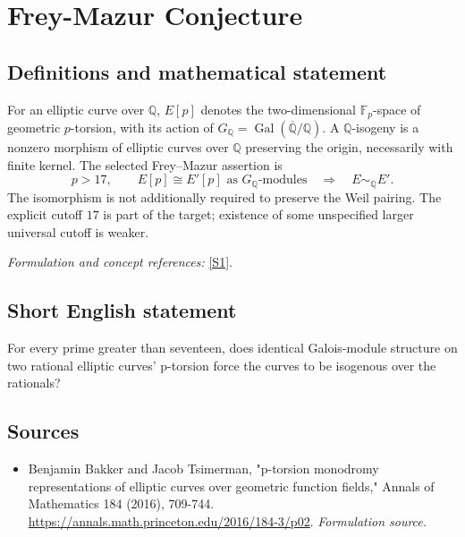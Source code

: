 \documentclass[11pt]{article}
\begin{document}
\section*{\texorpdfstring{Frey-Mazur Conjecture}{Frey-Mazur Conjecture}}\label{30006835}
\subsection{Definitions and mathematical statement}
For an elliptic curve over ${\mathbb{Q}}$, $E[p]$ denotes the two-dimensional ${\mathbb{F}}_p$-space of geometric $p$-torsion, with its action of $G_{{\mathbb{Q}}}=\operatorname{Gal}(\overline{{\mathbb{Q}}}/{\mathbb{Q}})$. A ${\mathbb{Q}}$-isogeny is a nonzero morphism of elliptic curves over ${\mathbb{Q}}$ preserving the origin, necessarily with finite kernel. The selected Frey--Mazur assertion is
\[
 p>17,\qquad E[p]\cong E'[p]\text{ as }G_{{\mathbb{Q}}}\text{-modules}
 \quad\Longrightarrow\quad E\sim_{{\mathbb{Q}}}E'.
\]
The isomorphism is not additionally required to preserve the Weil pairing. The explicit cutoff $17$ is part of the target; existence of some unspecified larger universal cutoff is weaker.
\par\smallskip\textit{Formulation and concept references:} \href{https://annals.math.princeton.edu/2016/184-3/p02}{[S1]}.

\subsection{Short English statement}
For every prime greater than seventeen, does identical Galois-module structure on two rational elliptic curves' p-torsion force the curves to be isogenous over the rationals?
\subsection{Sources}
\begin{itemize}
\item[S1]Benjamin Bakker and Jacob Tsimerman, "p-torsion monodromy representations of elliptic curves over geometric function fields," Annals of Mathematics 184 (2016), 709-744.
\url{https://annals.math.princeton.edu/2016/184-3/p02}.
\textit{Formulation source.}
\end{itemize}
\end{document}
